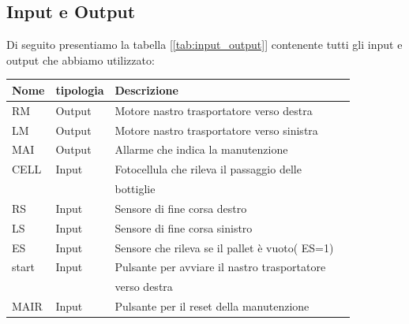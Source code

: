 \documentclass{article}
\begin{document}
\subsection{Input e Output}
Di seguito presentiamo la tabella [\ref{tab:input_output}] contenente tutti gli input e output che abbiamo utilizzato:
\begin{center}
    \begin{tabular}{l l l l }
        \toprule
        \textbf{Nome} & \textbf{tipologia} & \textbf{Descrizione}                           \\
        \midrule
        \midrule
        RM            & Output             & Motore nastro trasportatore verso destra       \\
        \midrule
        LM            & Output             & Motore nastro trasportatore verso sinistra     \\
        \midrule
        MAI           & Output             & Allarme che indica la manutenzione             \\
        \midrule
        CELL          & Input              & Fotocellula che rileva il passaggio delle      \\
                      &                    & bottiglie                                      \\
        \midrule

        RS            & Input              & Sensore di fine corsa destro                   \\
        \midrule
        LS            & Input              & Sensore di fine corsa sinistro                 \\
        \midrule
        ES            & Input              & Sensore che rileva se il pallet è vuoto( ES=1) \\
        \midrule
        start         & Input              & Pulsante per avviare il nastro trasportatore   \\
                      &                    & verso destra                                   \\
        \midrule
        MAIR          & Input              & Pulsante per il reset della manutenzione       \\
        \bottomrule
    \end{tabular}
    \label{tab:input_output}
\end{center}
\end{document}
